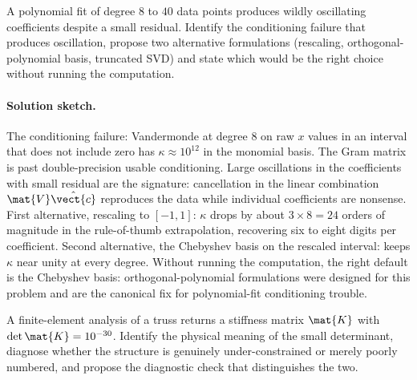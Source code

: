 \begin{exercise}
A polynomial fit of degree $8$ to $40$ data points produces wildly
oscillating coefficients despite a small residual. Identify the
conditioning failure that produces oscillation, propose two
alternative formulations (rescaling, orthogonal-polynomial basis,
truncated SVD) and state which would be the right choice without
running the computation.
\end{exercise}

\paragraph{Solution sketch.}
The conditioning failure: Vandermonde at degree $8$ on raw $x$
values in an interval that does not include zero has $\kappa
\approx 10^{12}$ in the monomial basis. The Gram matrix is past
double-precision usable conditioning. Large oscillations in the
coefficients with small residual are the signature: cancellation
in the linear combination $\mat{V}\hat{\vect{c}}$ reproduces the
data while individual coefficients are nonsense. First alternative,
rescaling to $[-1, 1]$: $\kappa$ drops by about $3 \times 8 = 24$
orders of magnitude in the rule-of-thumb extrapolation, recovering
six to eight digits per coefficient. Second alternative, the
Chebyshev basis on the rescaled interval: keeps $\kappa$ near
unity at every degree. Without running the computation, the
right default is the Chebyshev basis: orthogonal-polynomial
formulations were designed for this problem and are the canonical
fix for polynomial-fit conditioning trouble.

\begin{exercise}
A finite-element analysis of a truss returns a stiffness matrix
$\mat{K}$ with $\det \mat{K} = 10^{-30}$. Identify the physical
meaning of the small determinant, diagnose whether the structure
is genuinely under-constrained or merely poorly numbered, and
propose the diagnostic check that distinguishes the two.
\end{exercise}

